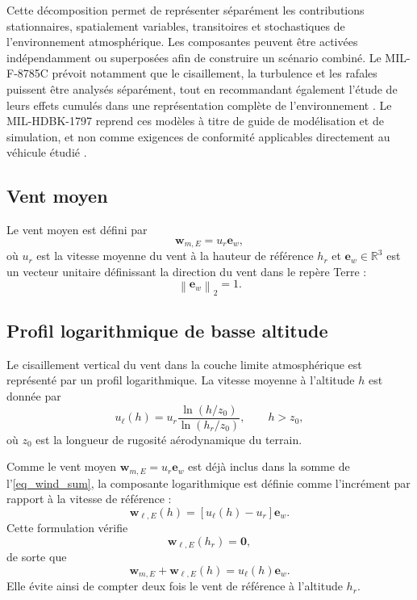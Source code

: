 \documentclass[11pt,a4paper,oneside]{report}
\newcommand{\vect}[1]{\bm{#1}}
\newcommand{\norm}[1]{\left\lVert#1\right\rVert}
\begin{document}
	Cette décomposition permet de représenter séparément les contributions stationnaires, spatialement variables, transitoires et stochastiques de l'environnement atmosphérique. Les composantes peuvent être activées indépendamment ou superposées afin de construire un scénario combiné. Le MIL-F-8785C prévoit notamment que le cisaillement, la turbulence et les rafales puissent être analysés séparément, tout en recommandant également l'étude de leurs effets cumulés dans une représentation complète de l'environnement \cite{MILF8785C}. Le MIL-HDBK-1797 reprend ces modèles à titre de guide de modélisation et de simulation, et non comme exigences de conformité applicables directement au véhicule étudié \cite{MILHDBK1797}.
	
	\subsection{Vent moyen}
	
	Le vent moyen est défini par
	\begin{equation}
		\vect w_{m,E}
		=
		u_r\vect e_w,
		\label{eq_mean_wind}
	\end{equation}
	où $u_r$ est la vitesse moyenne du vent à la hauteur de référence $h_r$ et $\vect e_w\in\mathbb{R}^3$ est un vecteur unitaire définissant la direction du vent dans le repère Terre :
	\begin{equation}
		\norm{\vect e_w}_2=1.
		\label{eq_mean_wind_direction_unit}
	\end{equation}
	
	\subsection{Profil logarithmique de basse altitude}
	
	Le cisaillement vertical du vent dans la couche limite atmosphérique est représenté par un profil logarithmique. La vitesse moyenne à l'altitude $h$ est donnée par
	\begin{equation}
		u_{\ell}(h)
		=
		u_r
		\frac{\ln\!\left(h/z_0\right)}
		{\ln\!\left(h_r/z_0\right)},
		\qquad
		h>z_0,
		\label{eq_log_wind_speed}
	\end{equation}
	où $z_0$ est la longueur de rugosité aérodynamique du terrain.
	
	Comme le vent moyen $\vect w_{m,E}=u_r\vect e_w$ est déjà inclus dans la somme de l'\cref{eq_wind_sum}, la composante logarithmique est définie comme l'incrément par rapport à la vitesse de référence :
	\begin{equation}
		\vect w_{\ell,E}(h)
		=
		\left[
		u_{\ell}(h)-u_r
		\right]\vect e_w.
		\label{eq_log_wind_increment}
	\end{equation}
	Cette formulation vérifie
	\begin{equation}
		\vect w_{\ell,E}(h_r)=\vect 0,
	\end{equation}
	de sorte que
	\begin{equation}
		\vect w_{m,E}+\vect w_{\ell,E}(h)
		=
		u_{\ell}(h)\vect e_w.
		\label{eq_total_mean_sheared_wind}
	\end{equation}
	Elle évite ainsi de compter deux fois le vent de référence à l'altitude $h_r$.
	
\end{document}

